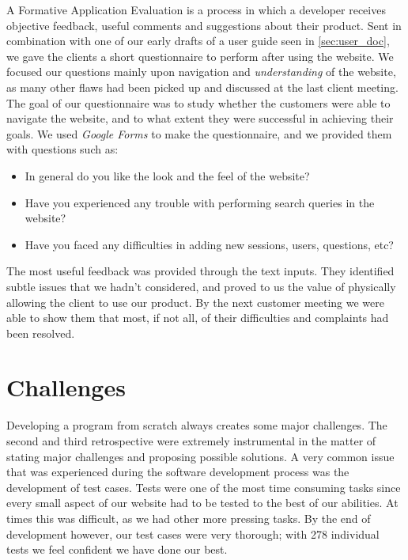 \documentclass{l3proj}
\begin{document}
A Formative Application Evaluation is a process in which a developer receives objective feedback, useful comments and suggestions about their product. Sent in combination with one of our early drafts of a user guide seen in \autoref{sec:user_doc}, we gave the clients a short questionnaire to perform after using the website. We focused our questions mainly upon navigation and \textit{understanding} of the website, as many other flaws had been picked up and discussed at the last client meeting. The goal of our questionnaire was to study whether the customers were able to navigate the website, and to what extent they were successful in achieving their goals. We used \textit{Google Forms} to make the questionnaire, and we provided them with questions such as:
\begin{itemize}
\item In general do you like the look and the feel of the website?
\item Have you experienced any trouble with performing search queries in the website?
\item Have you faced any difficulties in adding new sessions, users, questions, etc?
\end{itemize}

The most useful feedback was provided through the text inputs. They identified subtle issues that we hadn't considered, and proved to us the value of physically allowing the client to use our product. By the next customer meeting we were able to show them that most, if not all, of their difficulties and complaints had been resolved.


\section{Challenges}
\label{challenges}

Developing a program from scratch always creates some major challenges. The second and third retrospective were extremely instrumental in the matter of stating major challenges and proposing possible solutions. A very common issue that was experienced during the software development process was the development of test cases. Tests were one of the most time consuming tasks since every small aspect of our website had to be tested to the best of our abilities. At times this was difficult, as we had other more pressing tasks. By the end of development however, our test cases were very thorough; with 278 individual tests we feel confident we have done our best.
\end{document}
